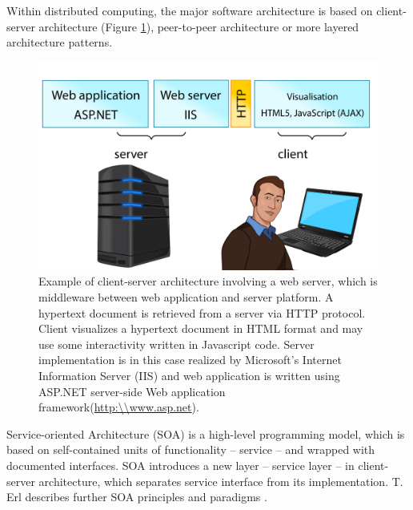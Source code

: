 Within distributed computing, the major software architecture is based on client-server architecture (Figure \ref{fig:architecture}), peer-to-peer architecture or more layered architecture patterns.
\begin{figure}[ht]
    \centering
    \includegraphics[width=1\textwidth]{img/chapter2-architektura-01.png}
    \caption{Example of client-server architecture involving a web server, which is middleware between web application and server platform. A hypertext document is retrieved from a server via HTTP protocol. Client visualizes a hypertext document in HTML format and may use some interactivity written in Javascript code. Server implementation is in this case realized by Microsoft's Internet Information Server (IIS) and web application is written using ASP.NET server-side Web application framework(\url{http:\\www.asp.net}).}
    \label{fig:architecture}
\end{figure}


Service-oriented Architecture (SOA) is a high-level programming model, which is based on self-contained units of functionality -- service -- and wrapped with documented interfaces. SOA introduces a new layer -- service layer -- in client-server architecture, which separates service interface from its implementation. T. Erl describes further SOA principles and paradigms \cite{Erl2008}. 

